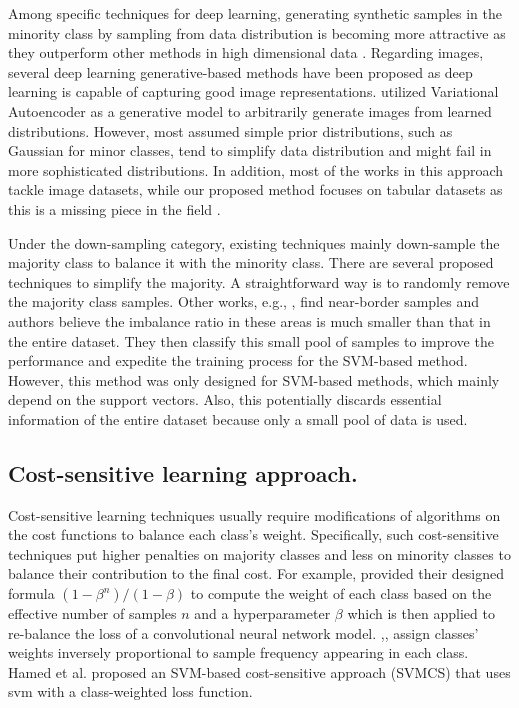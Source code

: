 Among specific techniques for deep learning, generating synthetic samples in the minority class by sampling from data distribution is becoming more attractive as they outperform other methods in high dimensional data \cite{DBLP:conf/dmin/LiuGM07}. Regarding images, several deep learning generative-based methods have been proposed as deep learning is capable of capturing good image representations. \cite{rashid_convergence_2012} \cite{dai_generative_2019} \cite{mullick_generative_2019} utilized Variational Autoencoder as a generative model to arbitrarily generate images from learned distributions. However, most assumed simple prior distributions, such as Gaussian for minor classes, tend to simplify data distribution and might fail in more sophisticated distributions. In addition, most of the works in this approach tackle image datasets, while our proposed method focuses on tabular datasets as this is a missing piece in the field \cite{johnson_survey_2019}.

Under the down-sampling category, existing techniques mainly down-sample the majority class to balance it with the minority class. There are several proposed techniques to simplify the majority. A straightforward way is to randomly remove the majority class samples. Other works, e.g., \cite{ertekin_learning_2007}, \cite{aggarwal_active_2020} find near-border samples and authors believe the imbalance ratio in these areas is much smaller than that in the entire dataset. They then classify this small pool of samples to improve the performance and expedite the training process for the SVM-based method. However, this method was only designed for SVM-based methods, which mainly depend on the support vectors. Also, this potentially discards essential information of the entire dataset because only a small pool of data is used.  

\subsection{Cost-sensitive learning approach.}
Cost-sensitive learning techniques usually require modifications of algorithms on the cost functions to balance each class's weight. Specifically, such cost-sensitive techniques put higher penalties on majority classes and less on minority classes to balance their contribution to the final cost. For example,  \cite{cui_class-balanced_2019} provided their designed formula $ (1 - \beta^n)/(1 - \beta)$ to compute the weight of each class based on the effective number of samples $n$ and a hyperparameter $\beta$ which is then applied to re-balance the loss of a convolutional neural network model.  \cite{huang_learning_2016},\cite{rangarajan_sridhar_unsupervised_2015}, \cite{DBLP:journals/corr/abs-1805-00932} assign classes' weights inversely proportional to sample frequency appearing in each class. Hamed et al. \cite{cssvm} proposed an SVM-based cost-sensitive approach (SVMCS) that uses svm with a class-weighted loss function.  
  
